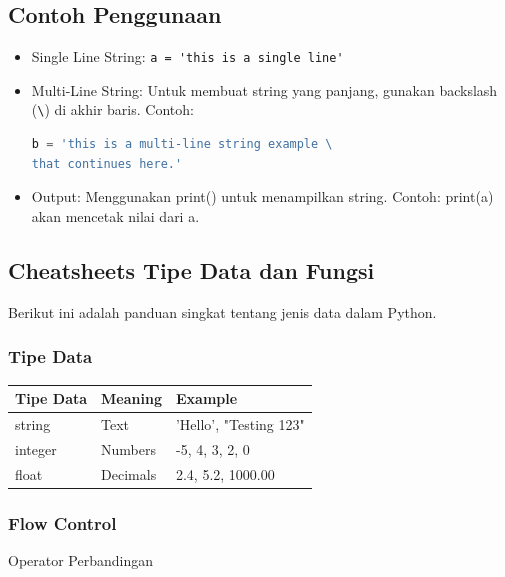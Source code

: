 \documentclass{article}
\begin{document}
\subsection{Contoh Penggunaan}
\begin{itemize}
    \item Single Line String: \verb|a = 'this is a single line'|
    \item Multi-Line String: Untuk membuat string yang panjang, gunakan backslash (\verb|\|) di akhir baris. Contoh:
          \begin{lstlisting}[language=Python, caption={}, captionpos=b]
b = 'this is a multi-line string example \
that continues here.'
\end{lstlisting}
    \item Output: Menggunakan print() untuk menampilkan string. Contoh: print(a) akan mencetak nilai dari a.
\end{itemize}

\subsection{Cheatsheets Tipe Data dan Fungsi}
Berikut ini adalah panduan singkat tentang jenis data dalam Python.
\subsubsection{Tipe Data}
\begin{tabularx}{\textwidth}{|X|X|X|}
    \hline
    \textbf{Tipe Data} & \textbf{Meaning} & \textbf{Example}       \\
    \hline
    string             & Text             & 'Hello', "Testing 123" \\
    \hline
    integer            & Numbers          & -5, 4, 3, 2, 0         \\
    \hline
    float              & Decimals         & 2.4, 5.2, 1000.00      \\
    \hline
\end{tabularx}

\subsubsection{Flow Control}
Operator Perbandingan
\end{document}
